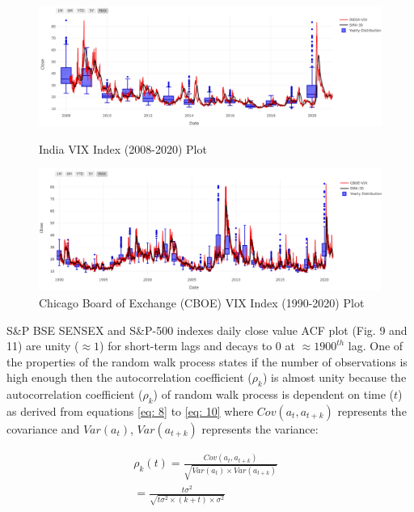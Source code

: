 \documentclass[conference]{IEEEtran}
\begin{document}
\begin{figure}[htbp]
	\centering
	\includegraphics[scale = 1.5, width = 0.50 \textwidth]{images/INDIA-VIX (2008-2020).png}
	\vspace{-0.3in}
	\caption{India VIX Index (2008-2020) Plot}
	\label{fig:india_vix_index}
	
	\vspace{0.1in}
	\includegraphics[scale = 1.5, width = 0.50 \textwidth]{images/CBOE-VIX.png}
	\vspace{-0.3in}
	\caption{Chicago Board of Exchange (CBOE) VIX Index (1990-2020) Plot}
	\label{fig:cboe_vix_index}
\end{figure}

S\&P BSE SENSEX and S\&P-500 indexes daily close value ACF plot (Fig. 9 and 11) are unity ($\approx 1$) for short-term lags and decays to $0$ at $\approx 1900^{th}$ lag. One of the properties of the random walk process states if the number of observations is high enough then the autocorrelation coefficient ($\rho_{k}$) is almost unity because the autocorrelation coefficient ($\rho_{k}$) of random walk process is dependent on time ($t$) as derived from equations \eqref{eq: 8} to \eqref{eq: 10} where $Cov(a_{t}, a_{t+k})$ represents the covariance and $Var(a_{t})$, $Var({a_{t + k}})$ represents the variance:

\begin{align}
\rho_{k}(t) = \frac{Cov(a_{t}, a_{t+k})}{\sqrt{Var(a_{t}) \times Var(a_{t + k})}} \label{eq: 8}& \\ = \frac{t\sigma^{2}}{\sqrt{t\sigma^{2}\times(k + t)\times \sigma^{2}}} \label{eq: 9}
\end{align}

\end{document}
